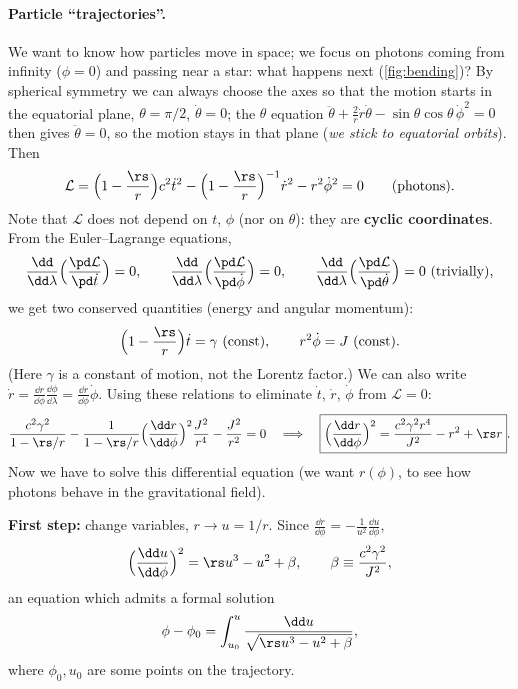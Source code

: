 \paragraph{Particle ``trajectories''.} We want to know how particles move in space; we focus on photons coming from infinity ($\phi=0$) and passing near a star: what happens next (\cref{fig:bending})? By spherical symmetry we can always choose the axes so that the motion starts in the equatorial plane, $\theta=\pi/2$, $\dot\theta=0$; the $\theta$ equation $\ddot\theta+\frac2r\dot r\dot\theta-\sin\theta\cos\theta\,\dot\phi^2=0$ then gives $\ddot\theta=0$, so the motion stays in that plane (\emph{we stick to equatorial orbits}). Then
\begin{equation}
  \mathcal L=\Big(1-\frac\rs r\Big)c^2\dot t^2-\Big(1-\frac\rs r\Big)^{-1}\dot r^2-r^2\dot\phi^2=0\qquad\text{(photons)}.
\end{equation}
Note that $\mathcal L$ does not depend on $t$, $\phi$ (nor on $\theta$): they are \textbf{cyclic coordinates}. From the Euler--Lagrange equations,
\[
  \frac{\dd}{\dd\lambda}\Big(\frac{\pd\mathcal L}{\pd\dot t}\Big)=0,\qquad\frac{\dd}{\dd\lambda}\Big(\frac{\pd\mathcal L}{\pd\dot\phi}\Big)=0,\qquad\frac{\dd}{\dd\lambda}\Big(\frac{\pd\mathcal L}{\pd\dot\theta}\Big)=0\ \text{(trivially)},
\]
we get two conserved quantities (energy and angular momentum):
\begin{equation}
  \Big(1-\frac\rs r\Big)\dot t=\gamma\ (\text{const}),\qquad r^2\dot\phi=J\ (\text{const}).
\end{equation}
(Here $\gamma$ is a constant of motion, not the Lorentz factor.) We can also write $\dot r=\frac{\dd r}{\dd\phi}\frac{\dd\phi}{\dd\lambda}=\frac{\dd r}{\dd\phi}\dot\phi$. Using these relations to eliminate $\dot t$, $\dot r$, $\dot\phi$ from $\mathcal L=0$:
\[
  \frac{c^2\gamma^2}{1-\rs/r}-\frac{1}{1-\rs/r}\Big(\frac{\dd r}{\dd\phi}\Big)^2\frac{J^2}{r^4}-\frac{J^2}{r^2}=0
  \quad\Longrightarrow\quad
  \boxed{\Big(\frac{\dd r}{\dd\phi}\Big)^2=\frac{c^2\gamma^2r^4}{J^2}-r^2+\rs r} .
\]
Now we have to solve this differential equation (we want $r(\phi)$, to see how photons behave in the gravitational field).

\textbf{First step:} change variables, $r\to u=1/r$. Since $\frac{\dd r}{\dd\phi}=-\frac{1}{u^2}\frac{\dd u}{\dd\phi}$,
\begin{equation}
  \Big(\frac{\dd u}{\dd\phi}\Big)^2=\rs u^3-u^2+\beta,\qquad\beta\equiv\frac{c^2\gamma^2}{J^2},
\end{equation}
an equation which admits a formal solution
\[
  \phi-\phi_0=\int_{u_0}^u\frac{\dd u}{\sqrt{\rs u^3-u^2+\beta}},
\]
where $\phi_0,u_0$ are some points on the trajectory.

